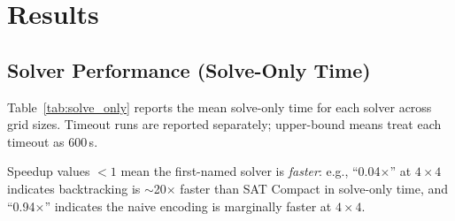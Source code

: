 \documentclass[12pt]{article}
\begin{document}
\section{Results}

\subsection{Solver Performance (Solve-Only Time)}

Table~\ref{tab:solve_only} reports the mean solve-only time for each solver across grid sizes. Timeout runs are reported separately; upper-bound means treat each timeout as 600\,s.

\begin{table}[htbp]
\centering
\caption{Solver performance: solve-only time (mean $\pm$ std).}
\label{tab:solve_only}
\vspace{0.5ex}

\begin{flushleft}
{\small Speedup values $<1$ mean the first-named solver is {\em faster}: e.g., ``0.04$\times$'' at $4\times4$ indicates backtracking is $\sim$20$\times$ faster than SAT Compact in solve-only time, and ``0.94$\times$'' indicates the naive encoding is marginally faster at $4\times4$.}
\end{flushleft}
\end{table}
\end{document}
